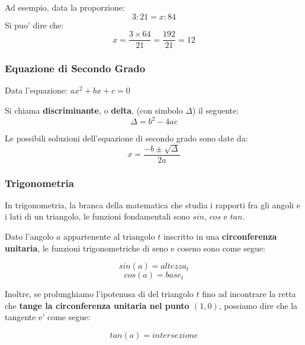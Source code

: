 \documentclass{article}
\begin{document}
{{    Ad esempio, data la proporzione:
    $$ 3 : 21 = x : 84 $$
    Si puo' dire che:
    $$ x = \frac{3 \times 64}{21} = \frac{192}{21} = 12 $$

    \subsubsection{Equazione di Secondo Grado}
    Data l'equazione: $ax^2 + bx + c = 0 $

    Si chiama \textbf{discriminante}, o \textbf{delta}, \small{(con simbolo $ \Delta $)} il seguente:
    $$ \Delta = b^2 - 4ac $$

    Le possibili soluzioni dell'equazione di secondo grado sono date da:
    $$ x = \frac{-b \pm \sqrt{\Delta}}{2a} $$

    \pagebreak

    \subsubsection{Trigonometria}
    In trigonometria, la branca della matematica che studia i rapporti fra gli angoli e i lati di un triangolo, le funzioni fondamentali sono $ sin $, $ cos $ e $ tan $.

    Dato l'angolo $ a $ appartenente al triangolo $ t $ inscritto in una \textbf{circonferenza unitaria}, le funzioni trigonometriche di seno e coseno sono come segue:

    $$ sin(a) = altezza_t $$
    $$ cos(a) = base_t $$

    Inoltre, se prolunghiamo l'ipotenusa di del triangolo $ t $ fino ad incontrare la retta che \textbf{tange la circonferenza unitaria nel punto $ (1,0) $}, possiamo dire che la tangente e' come segue:


    $$ tan(a) = intersezione $$

    \usetikzlibrary{angles,quotes}
    \newcommand\Base[1][0]{
      \begin{scope}[xshift=#1]
        \clip
          (-0.5,5.5) rectangle (5.5,-0.5);
          \draw[->]
          (-0.5,0) -- (5,0) node[right] {$x$};
        \draw[->]
          (0,-0.5) -- (0,5) node[above] {$y$};
        \coordinate (O) at (0,0);
        \coordinate (aux1) at (40:4);
        \coordinate (aux2) at (aux1|-0,0);
        \coordinate (aux3) at (4,{4*tan(40)});
        \draw
          (O) -- (aux3) -- (aux3|-0,0)
          (aux1) -- (aux2);
        \draw[thick,red!70!black] 
          (O) circle (4);
        \pic[draw,"$a$",angle radius=30pt,angle eccentricity=1.2] {angle = aux2--O--aux1};   
      \end{scope}  
    }

}}
\end{document}
